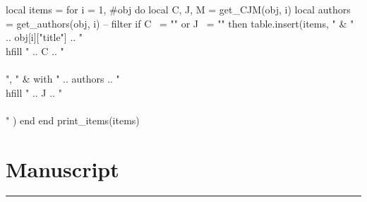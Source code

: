\documentclass{article}
\begin{document}
\begin{luacode}
  local items = {}
  for i = 1, #obj do
    local C, J, M = get_CJM(obj, i)
    local authors = get_authors(obj, i)
    -- filter
    if C ~= "" or J ~= "" then
      table.insert(items, {
        " & " .. obj[i]["title"] .. " \\hfill " .. C .. "\\\\",
        " & with " .. authors .. " \\hfill " .. J .. "\\\\"
      })
    end
  end
  print_items(items)
\end{luacode}


\section*{Manuscript}
\vspace{-1em} \hrule \vspace{1em}
\end{document}
